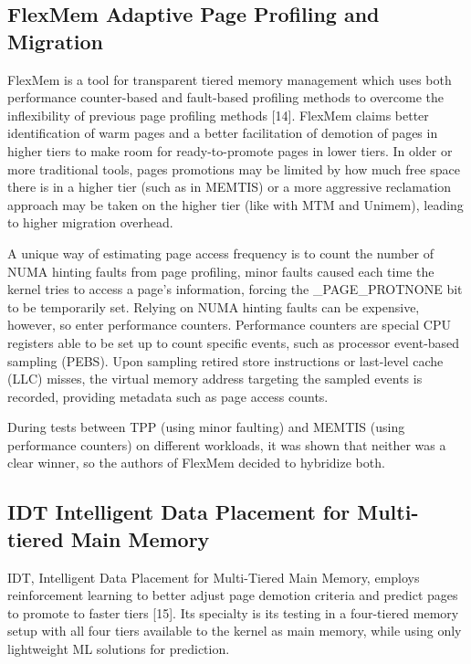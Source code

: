 \documentclass[conference]{IEEEtran}
\begin{document}
\subsection{FlexMem Adaptive Page Profiling and Migration}
FlexMem is a tool for transparent tiered memory management which uses both performance counter-based and fault-based profiling methods to overcome the inflexibility of previous page profiling methods [14].  FlexMem claims better identification of warm pages and a better facilitation of demotion of pages in higher tiers to make room for ready-to-promote pages in lower tiers.  In older or more traditional tools, pages promotions may be limited by how much free space there is in a higher tier (such as in MEMTIS) or a more aggressive reclamation approach may be taken on the higher tier (like with MTM and Unimem), leading to higher migration overhead.   

A unique way of estimating page access frequency is to count the number of NUMA hinting faults from page profiling, minor faults caused each time the kernel tries to access a page’s information, forcing the \_PAGE\_PROTNONE bit to be temporarily set.  Relying on NUMA hinting faults can be expensive, however, so enter performance counters.  Performance counters are special CPU registers able to be set up to count specific events, such as processor event-based sampling (PEBS).  Upon sampling retired store instructions or last-level cache (LLC) misses, the virtual memory address targeting the sampled events is recorded, providing metadata such as page access counts. 

During tests between TPP (using minor faulting) and MEMTIS (using performance counters) on different workloads, it was shown that neither was a clear winner, so the authors of FlexMem decided to hybridize both. 

\subsection{IDT Intelligent Data Placement for Multi-tiered Main Memory}
IDT, Intelligent Data Placement for Multi-Tiered Main Memory, employs reinforcement learning to better adjust page demotion criteria and predict pages to promote to faster tiers [15].  Its specialty is its testing in a four-tiered memory setup with all four tiers available to the kernel as main memory, while using only lightweight ML solutions for prediction. 
\end{document}
